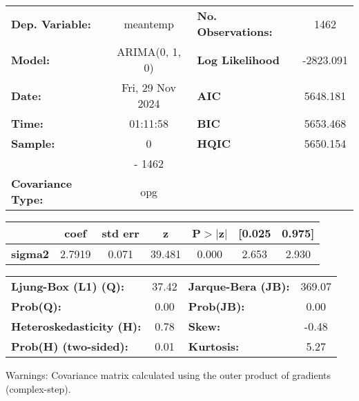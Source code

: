 \documentclass{article}
\begin{document}
\begin{center}
    \begin{tabular}{lclc}
    \toprule
    \textbf{Dep. Variable:}          &     meantemp     & \textbf{  No. Observations:  } &    1462     \\
    \textbf{Model:}                  &  ARIMA(0, 1, 0)  & \textbf{  Log Likelihood     } & -2823.091   \\
    \textbf{Date:}                   & Fri, 29 Nov 2024 & \textbf{  AIC                } &  5648.181   \\
    \textbf{Time:}                   &     01:11:58     & \textbf{  BIC                } &  5653.468   \\
    \textbf{Sample:}                 &        0         & \textbf{  HQIC               } &  5650.154   \\
    \textbf{}                        &      - 1462      & \textbf{                     } &             \\
    \textbf{Covariance Type:}        &       opg        & \textbf{                     } &             \\
    \bottomrule
    \end{tabular}
    \begin{tabular}{lcccccc}
                    & \textbf{coef} & \textbf{std err} & \textbf{z} & \textbf{P$> |$z$|$} & \textbf{[0.025} & \textbf{0.975]}  \\
    \midrule
    \textbf{sigma2} &       2.7919  &        0.071     &    39.481  &         0.000        &        2.653    &        2.930     \\
    \bottomrule
    \end{tabular}
    \begin{tabular}{lclc}
    \textbf{Ljung-Box (L1) (Q):}     & 37.42 & \textbf{  Jarque-Bera (JB):  } & 369.07  \\
    \textbf{Prob(Q):}                &  0.00 & \textbf{  Prob(JB):          } &  0.00   \\
    \textbf{Heteroskedasticity (H):} &  0.78 & \textbf{  Skew:              } & -0.48   \\
    \textbf{Prob(H) (two-sided):}    &  0.01 & \textbf{  Kurtosis:          } &  5.27   \\
    \bottomrule
    \end{tabular}
    \end{center}
    
    Warnings: \newline
     [1] Covariance matrix calculated using the outer product of gradients (complex-step).
    
\end{document}

